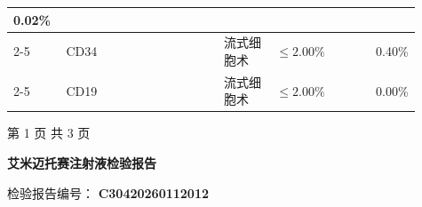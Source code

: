 \documentclass[UTF8,10pt,a4paper,fontset=fandol]{ctexart}
\newcommand{\fieldvalue}[1]{#1}
\begin{document}
\begin{center}
\begin{tabular}{|p{0.13\linewidth}|p{0.40\linewidth}|p{0.13\linewidth}|p{0.25\linewidth}|l|}
\fieldvalue{0.02\%}
\\ \cline{2-5}
&
\fieldvalue{CD34} &
\fieldvalue{流式细胞术} &
\fieldvalue{$\leq2.00\%$} &
\fieldvalue{0.40\%}
\\ \cline{2-5}
&
\fieldvalue{CD19} &
\fieldvalue{流式细胞术} &
\fieldvalue{$\leq2.00\%$} &
\fieldvalue{0.00\%}
\\ \hline
\end{tabular}
\end{center}

\begin{center}
第 1 页 共 3 页
\end{center}


\newpage

\begin{center}
\textbf{艾米迈托赛注射液检验报告}
\end{center}

检验报告编号：
\fieldvalue{\textbf{C30420260112012}}

\smallskip
\end{document}
